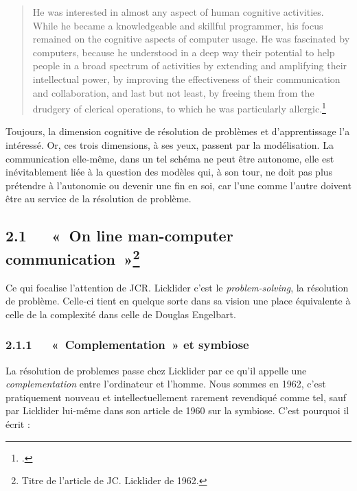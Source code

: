 \documentclass{FramateX}
\begin{document}
\begin{refsection}
\begin{quote}
He was interested in almost any aspect of human cognitive
activities. While he became a knowledgeable and skillful programmer,
his focus remained on the cognitive aspects of computer usage. He was
fascinated by computers, because he understood in a deep way their
potential to help people in a broad spectrum of activities by extending
and amplifying their intellectual power, by improving the effectiveness
of their communication and collaboration, and last but not least, by
freeing them from the drudgery of clerical operations, to which he was
particularly allergic.\footnote{\cite[p.~20]{fanojoseph1998}.}
\end{quote}

 Toujours, la
dimension cognitive de résolution de problèmes et d'apprentissage l'a intéressé. Or, ces trois dimensions, à ses yeux, passent par la
modélisation. La communication elle-même, dans un tel schéma ne peut
être autonome, elle est inévitablement liée à la question des modèles
qui, à son tour, ne doit pas plus prétendre à l'autonomie ou devenir
une fin en soi, car l'une comme l'autre doivent être au service de la
résolution de problème.




\subsection*{2.1~~~«~On line man-computer communication~»\protect\footnote{Titre de l'article de JC. Licklider de 1962.}}
{}


Ce qui focalise l'attention de JCR. Licklider c'est le \textit{problem-solving}, la résolution de problème. Celle-ci tient en
quelque sorte dans sa vision une place équivalente à celle de la
complexité dans celle de Douglas Engelbart.


\subsubsection*{2.1.1~~~«~Complementation~» et symbiose}
{}


La résolution de problemes passe chez Licklider par ce qu'il appelle
une \textit{complementation} entre l'ordinateur et l'homme. Nous sommes en
1962, c'est pratiquement nouveau et intellectuellement rarement
revendiqué comme tel, sauf par Licklider lui-même dans son article de
1960 sur la symbiose. C'est pourquoi il écrit :


\end{refsection}
\end{document}
